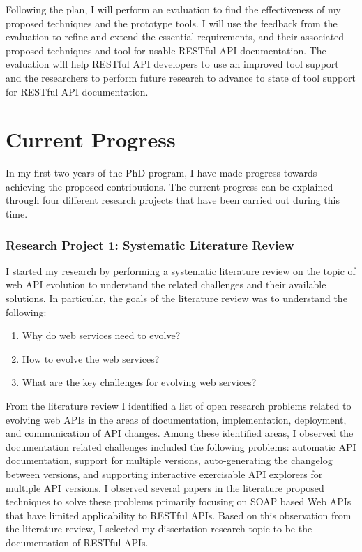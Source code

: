 \documentclass[11pt,oneside]{book}
\begin{document}
Following the plan, I will perform an evaluation to find the effectiveness of my proposed techniques and the prototype tools. I will use the feedback from the evaluation to refine and extend the essential requirements, and their associated proposed techniques and tool for usable RESTful API documentation. The evaluation will help RESTful API developers to use an improved tool support and the researchers to perform future research to advance to state of tool support for RESTful API documentation.

\chapter{Current Progress}

In my first two years of the PhD program, I have made progress towards achieving the proposed contributions. The current progress can be explained through four different research projects that have been carried out during this time.
\subsection{Research Project 1: Systematic Literature Review}
I started my research by performing a systematic literature review on the topic of web API evolution to understand the related challenges and their available solutions. In particular, the goals of the literature review was to understand the following:

\begin{enumerate}
  \item Why do web services need to evolve?
  \item How to evolve the web services?
  \item What are the key challenges for evolving web services?
\end{enumerate}

From the literature review I identified a list of open research problems related to evolving web APIs in the areas of documentation, implementation, deployment, and communication of API changes. Among these identified areas, I observed the documentation related challenges included the following problems: automatic API documentation, support for multiple versions, auto-generating the changelog between versions, and supporting interactive exercisable API explorers for multiple API versions. I observed several papers in the literature proposed techniques to solve these problems primarily focusing on SOAP based Web APIs that have limited applicability to RESTful APIs. Based on this observation from the literature review, I selected my dissertation research topic to be the documentation of RESTful APIs.
\end{document}

